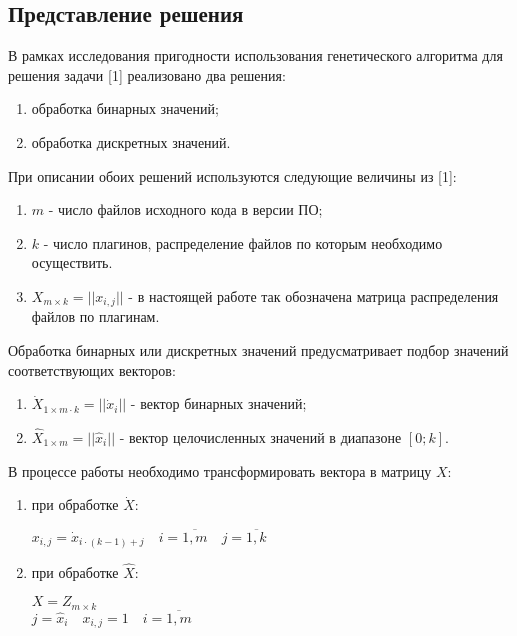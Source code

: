 \subsection*{Представление решения}
В рамках исследования пригодности использования генетического алгоритма для решения задачи [1] реализовано два решения:
\begin{enumerate}
  \item обработка бинарных значений;
  \item обработка дискретных значений.
\end{enumerate}

При описании обоих решений используются следующие величины из [1]:
\begin{enumerate}
  \item $m$ - число файлов исходного кода в версии ПО;
  \item $k$ - число плагинов, распределение файлов по которым необходимо осуществить.
  \item $X_{m \times k} = ||x_{i, j}||$ - в настоящей работе так обозначена матрица распределения файлов по плагинам.
\end{enumerate}

Обработка бинарных или дискретных значений предусматривает подбор значений соответствующих векторов:
\begin{enumerate}
  \item $\dot{X}_{1 \times m \cdot k} = ||\dot{x}_{i}||$ - вектор бинарных значений;
  \item $\hat{X}_{1 \times m} = ||\hat{x}_{i}||$ - вектор целочисленных значений в диапазоне $[0; k]$.
\end{enumerate}

В процессе работы необходимо трансформировать вектора в матрицу $X$:
\begin{enumerate}
  \item при обработке $\dot{X}$:
  \begin{center}
    $x_{i, j} = \dot{x}_{i \cdot (k - 1) + j} \quad i=\overline{1, m} \quad j=\overline{1, k}$
  \end{center}
  \item при обработке $\hat{X}$:
  \begin{center}
    $X = Z_{m \times k}$ \\
    $j = \hat{x}_{i} \quad x_{i, j} = 1 \quad i=\overline{1, m}$
  \end{center}
\end{enumerate}

